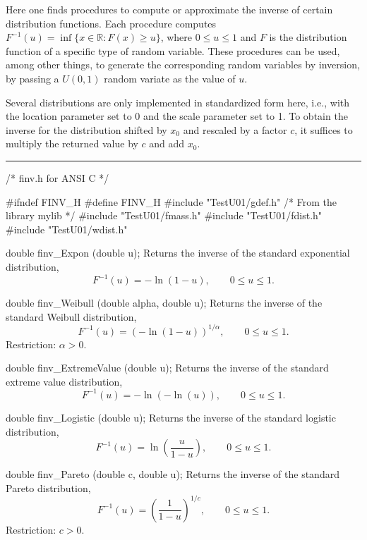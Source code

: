 
Here one finds procedures to compute or approximate the
inverse of certain distribution functions.
Each procedure computes $F^{-1}(u) = \inf\{x\in\mathbb{R} : F(x)\ge u\}$,
where $0\le u\le 1$ and $F$
is the distribution function of a specific type of random variable.
These procedures can be used, among other things, to generate
the corresponding random variables by inversion, by passing a
$U(0,1)$ random variate as the value of $u$.

Several distributions are only implemented in standardized form here,
i.e., with the location parameter set to 0 and the scale parameter
set to 1.  To obtain the inverse for the distribution shifted
by $x_0$ and rescaled by a factor $c$, it suffices to multiply the
returned value by $c$ and add $x_0$.

\bigskip\hrule\medskip
\code\hide
/* finv.h for ANSI C */

#ifndef FINV_H
#define FINV_H
\endhide
#include "TestU01/gdef.h"     /* From the library mylib */
#include "TestU01/fmass.h"
#include "TestU01/fdist.h"
#include "TestU01/wdist.h"
\endcode


\code

double finv_Expon (double u);
\endcode
  \tab
  Returns the inverse of the standard exponential distribution,
$$
     F^{-1}(u) = -\ln (1-u), \qquad  0 \le u \le 1.
$$
 \endtab
\code

double finv_Weibull (double alpha, double u);
\endcode
  \tab
  Returns the inverse of the standard Weibull distribution,
$$
     F^{-1}(u) = \left(-\ln (1-u) \right)^{1/\alpha}, \qquad  0 \le u \le 1.
$$
  Restriction: $\alpha > 0$.
 \endtab
\code


double finv_ExtremeValue (double u);
\endcode
  \tab
  Returns the inverse of the standard extreme value distribution,
$$
     F^{-1}(u) = -\ln (-\ln (u)), \qquad  0 \le u \le 1.
$$
 \endtab
\code

double finv_Logistic (double u);
\endcode
  \tab
  Returns the inverse of the standard logistic distribution,
$$
     F^{-1}(u) = \ln  \left(\frac{u}{1-u}\right), \qquad  0 \le u \le 1.
$$
 \endtab
\code

double finv_Pareto (double c, double u);
\endcode
  \tab
  Returns the inverse of the standard Pareto distribution,
$$
     F^{-1}(u) = \left(\frac 1 {1 - u}\right)^{1/c},
          \qquad  0 \le u \le 1.
$$
  Restriction: $c > 0$.
 \endtab
\code


